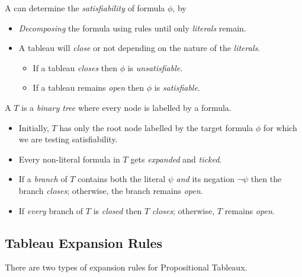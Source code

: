 \begin{definition}[Tableau]
    A  can determine the \textit{satisfiability} of formula $\phi$,
    by
    
    \begin{itemize}
        \item \textit{Decomposing} the formula using rules until only
            \textit{literals} remain.
        \item A tableau will \textit{close} or not depending on the
            nature of the \textit{literals}.
        \begin{itemize}
            \item If a tableau \textit{closes} then $\phi$ is \textit{unsatisfiable}.
            \item If a tableau remains \textit{open} then $\phi$ is
                \textit{satisfiable}.
        \end{itemize}
    \end{itemize}
    
    A  $T$ is a \textit{binary tree} where every node is labelled
    by a formula.
    
    \begin{itemize}
        \item Initially, $T$ has only the root node labelled by the target formula
            $\phi$ for which we are testing satisfiability.
        \item Every non-literal formula in $T$ gets \textit{expanded} and
            \textit{ticked}.
        \item If a \textit{branch} of $T$ contains both the literal $\psi$ 
            \textit{and} its negation $\neg \psi$ then the branch \textit{closes};
            otherwise, the branch remains \textit{open}.
        \item If \textit{every} branch of $T$ is \textit{closed} then $T$
            \textit{closes}; otherwise, $T$ remains \textit{open}.
    \end{itemize}
\end{definition}

\subsection{Tableau Expansion Rules}

There are two types of expansion rules for Propositional Tableaux.

